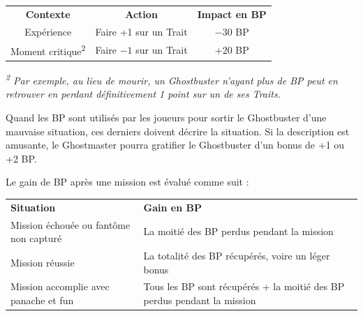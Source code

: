 \begin{frame}[b]
{\begin{center}
\begin{tabular}{ccc}
\textbf{Contexte} & \textbf{Action} & \textbf{Impact en BP}\\
Expérience & Faire +1 sur un Trait & $-30$ BP \\
Moment critique\textsuperscript{2} & Faire $-1$ sur un Trait & +20 BP \\
\end{tabular}
\end{center}

{\small \textit{\textsuperscript{2} Par exemple, au lieu de mourir, un Ghostbuster n'ayant plus de BP peut en retrouver en perdant définitivement 1 point sur un de ses Traits.}}

\myindent Quand les BP sont utilisés par les joueurs pour sortir le Ghostbuster d'une mauvaise situation, ces derniers doivent décrire la situation. Si la description est amusante, le Ghostmaster pourra gratifier le Ghostbuster d'un bonus de +1 ou +2 BP.


\myindent Le gain de BP après une mission est évalué comme suit :

\begin{center}\begin{tabular}{>{\centering\arraybackslash}p{3cm}>{\centering\arraybackslash}p{5cm}}
\textbf{Situation} & \textbf{Gain en BP}\\
Mission échouée ou fantôme non capturé & La moitié des BP perdus pendant la mission \\
Mission réussie & La totalité des BP récupérés, voire un léger bonus \\
Mission accomplie avec panache et fun & Tous les BP sont récupérés + la moitié des BP perdus pendant la mission \\
\end{tabular}
\end{center}


}
\end{frame}

